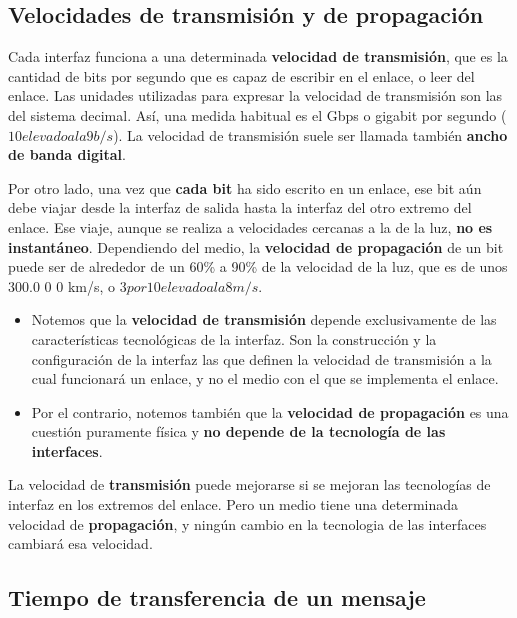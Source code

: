 \documentclass[spanish,A4,]{article}
\begin{document}
\subsection{Velocidades de transmisión y de
propagación}\label{velocidades-de-transmisiuxf3n-y-de-propagaciuxf3n}

Cada interfaz funciona a una determinada \textbf{velocidad de
transmisión}, que es la cantidad de bits por segundo que es capaz de
escribir en el enlace, o leer del enlace. Las unidades utilizadas para
expresar la velocidad de transmisión son las del sistema decimal. Así,
una medida habitual es el Gbps o gigabit por segundo ($10 elevado a la 9 b/s$). La
velocidad de transmisión suele ser llamada también \textbf{ancho de
banda digital}.

Por otro lado, una vez que \textbf{cada bit} ha sido escrito en un
enlace, ese bit aún debe viajar desde la interfaz de salida hasta la
interfaz del otro extremo del enlace. Ese viaje, aunque se realiza a
velocidades cercanas a la de la luz, \textbf{no es instantáneo}.
Dependiendo del medio, la \textbf{velocidad de propagación} de un bit
puede ser de alrededor de un 60\% a 90\% de la velocidad de la luz, que
es de unos 300.0 0 0 km/s, o $3 por  10 elevado a la 8 m/s$.

\begin{itemize}
\itemsep1pt\parskip0pt
\item
  Notemos que la \textbf{velocidad de transmisión} depende
  exclusivamente de las características tecnológicas de la interfaz. Son
  la construcción y la configuración de la interfaz las que definen la
  velocidad de transmisión a la cual funcionará un enlace, y no el medio
  con el que se implementa el enlace.
\item
  Por el contrario, notemos también que la \textbf{velocidad de
  propagación} es una cuestión puramente física y \textbf{no depende de
  la tecnología de las interfaces}.
\end{itemize}

La velocidad de \textbf{transmisión} puede mejorarse si se mejoran las
tecnologías de interfaz en los extremos del enlace. Pero un medio tiene
una determinada velocidad de \textbf{propagación}, y ningún cambio en la
tecnologia de las interfaces cambiará esa velocidad.

\subsection{Tiempo de transferencia de un
mensaje}\label{tiempo-de-transferencia-de-un-mensaje}
\end{document}

